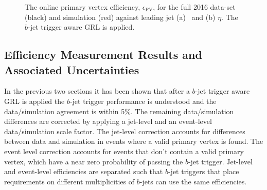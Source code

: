 \begin{figure}[!ht]
  \begin{center}
    \captionsetup[subfigure]{aboveskip=0pt,justification=centering}
  \end{center}
\vspace{-1em}
\caption[
  The online primary vertex efficiency for the full 2016 data-set and for simulation.
  The $b$-jet trigger aware GRL is applied.
]
        {
  The online primary vertex efficiency, $\epsilon_{\text{PV}}$, for the full 2016 data-set (black) and simulation (red) against leading jet (a) \pT~and (b) $\eta$.
  The $b$-jet trigger aware GRL is applied.}
  \label{fig:Full_bslt2mm_bperf}
\end{figure}

\clearpage
\subsection{Efficiency Measurement Results and Associated Uncertainties}
\label{sec:trig-eff_syst}

In the previous two sections it has been shown that after a $b$-jet trigger aware GRL is applied
the $b$-jet trigger performance is understood and the data/simulation agreement is within 5\%.
The remaining data/simulation differences are corrected by applying a jet-level and an event-level data/simulation scale factor.
The jet-level correction accounts for differences between data and simulation in events where a valid primary vertex is found.
The event level correction accounts for events that don't contain a valid primary vertex, which have a near zero probability of passing the $b$-jet trigger.
Jet-level and event-level efficiencies are separated such that $b$-jet triggers that place requirements on different multiplicities of $b$-jets can use the same efficiencies.

